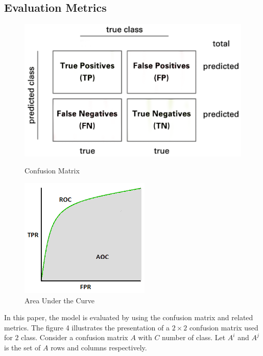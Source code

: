 \subsection{Evaluation Metrics}
\begin{figure}[!htb]
	\begin{minipage}{0.48\textwidth}
		\centering
		\includegraphics[width=1.1\linewidth]{img/Confusion-matrix}
		\caption{Confusion Matrix}\label{Fig:Data1}
	\end{minipage}\hfill
	\begin{minipage}{0.48\textwidth}
		\centering
		\includegraphics[width=.7\linewidth]{img/AUC}
		\caption{Area Under the Curve}\label{Fig:Data2}
	\end{minipage}
\end{figure}
In this paper, the model is evaluated by using the confusion matrix and related metrics. The figure 4 illustrates the presentation of a $2 \times 2$ confusion matrix used for $2$ class. Consider a confusion matrix $A$ with $C$ number of class. Let $A^i$ and $A^j$ is the set of $A$ rows and columns respectively. 
